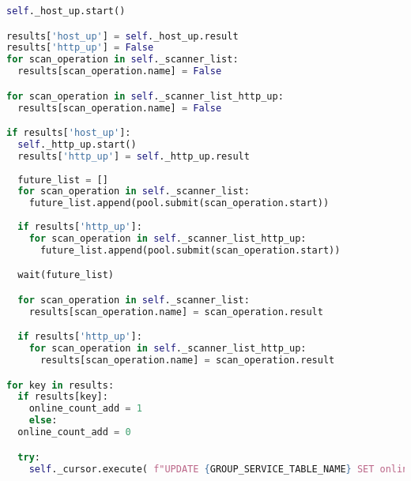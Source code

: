 \begin{lstlisting}[language=Python, frame=single, caption={Big Brother Scanner}, captionpos=b, label={lst:bigbrother-scanner}]
self._host_up.start()

results['host_up'] = self._host_up.result
results['http_up'] = False
for scan_operation in self._scanner_list:
  results[scan_operation.name] = False

for scan_operation in self._scanner_list_http_up:
  results[scan_operation.name] = False

if results['host_up']:
  self._http_up.start()
  results['http_up'] = self._http_up.result
  
  future_list = []
  for scan_operation in self._scanner_list:
    future_list.append(pool.submit(scan_operation.start))
    
  if results['http_up']:
    for scan_operation in self._scanner_list_http_up:
      future_list.append(pool.submit(scan_operation.start))

  wait(future_list)

  for scan_operation in self._scanner_list:
    results[scan_operation.name] = scan_operation.result

  if results['http_up']:
    for scan_operation in self._scanner_list_http_up:
      results[scan_operation.name] = scan_operation.result

for key in results:
  if results[key]:
    online_count_add = 1
    else:
  online_count_add = 0

  try:
    self._cursor.execute( f"UPDATE {GROUP_SERVICE_TABLE_NAME} SET online_count =  online_count + {online_count_add}, scan_count =  scan_count + 1, was_online = {results[key]}, last_scan = CURRENT_TIMESTAMP WHERE group_id = {self._id} AND service_id = {self._get_id_of_scan_operation(key)}")
\end{lstlisting}